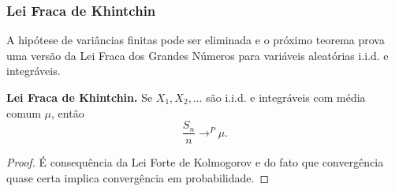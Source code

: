 %
%
%
%
%


\begin{frame}
\frametitle{\textbf{Lei Fraca de Khintchin}}


A hipótese de variâncias finitas pode ser eliminada e o próximo
teorema prova uma versão da Lei Fraca dos Grandes Números para
variáveis aleatórias i.i.d. e integráveis.

\begin{teo} {\bf Lei Fraca de Khintchin.}
Se $X_1,X_2,\ldots$ são i.i.d. e integráveis com média comum $\mu$,
então
$$\frac{S_n}{n}\rightarrow^P \mu.$$
\end{teo}

\begin{proof} É consequência da Lei Forte de Kolmogorov e do fato que
convergência quase certa implica convergência em probabilidade.
\end{proof}

\end{frame}


